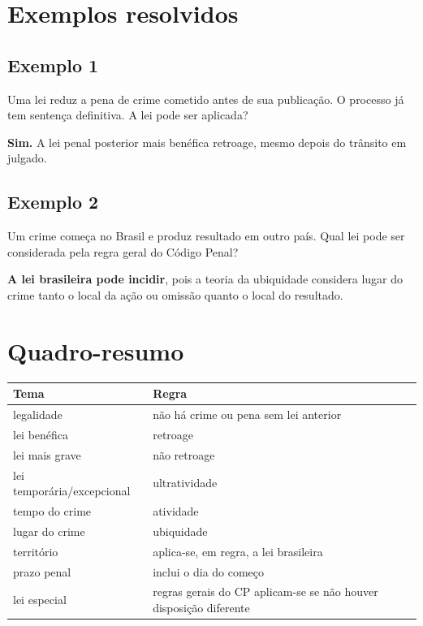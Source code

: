 \documentclass[11pt,a4paper]{article}
\begin{document}
\section*{Exemplos resolvidos}

\subsection*{Exemplo 1}

Uma lei reduz a pena de crime cometido antes de sua publicação. O processo já tem sentença definitiva. A lei pode ser aplicada?

\textbf{Sim.} A lei penal posterior mais benéfica retroage, mesmo depois do trânsito em julgado.

\subsection*{Exemplo 2}

Um crime começa no Brasil e produz resultado em outro país. Qual lei pode ser considerada pela regra geral do Código Penal?

\textbf{A lei brasileira pode incidir}, pois a teoria da ubiquidade considera lugar do crime tanto o local da ação ou omissão quanto o local do resultado.

\section*{Quadro-resumo}

\begin{tabularx}{\linewidth}{lX}
\toprule
 \textbf{Tema} & \textbf{Regra} \\
\midrule
 legalidade & não há crime ou pena sem lei anterior \\
 lei benéfica & retroage \\
 lei mais grave & não retroage \\
 lei temporária/excepcional & ultratividade \\
 tempo do crime & atividade \\
 lugar do crime & ubiquidade \\
 território & aplica-se, em regra, a lei brasileira \\
 prazo penal & inclui o dia do começo \\
 lei especial & regras gerais do CP aplicam-se se não houver disposição diferente \\
\bottomrule
\end{tabularx}
\end{document}
